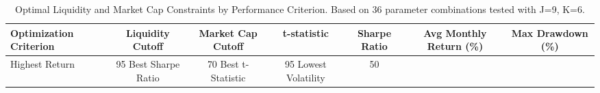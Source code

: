 \begin{table}
\caption{Optimal Liquidity and Market Cap Constraints by Performance Criterion. Based on 36 parameter combinations tested with J=9, K=6.}
\label{tab:constraints_optimal}
\begin{tabular}{l|cc|cccc}
\toprule
Optimization Criterion & Liquidity Cutoff & Market Cap Cutoff & t-statistic & Sharpe Ratio & Avg Monthly Return (\%) & Max Drawdown (\%) \\
\midrule
Highest Return & 95%
Best Sharpe Ratio & 70%
Best t-Statistic & 95%
Lowest Volatility & 50%
\bottomrule
\end{tabular}
\end{table}
